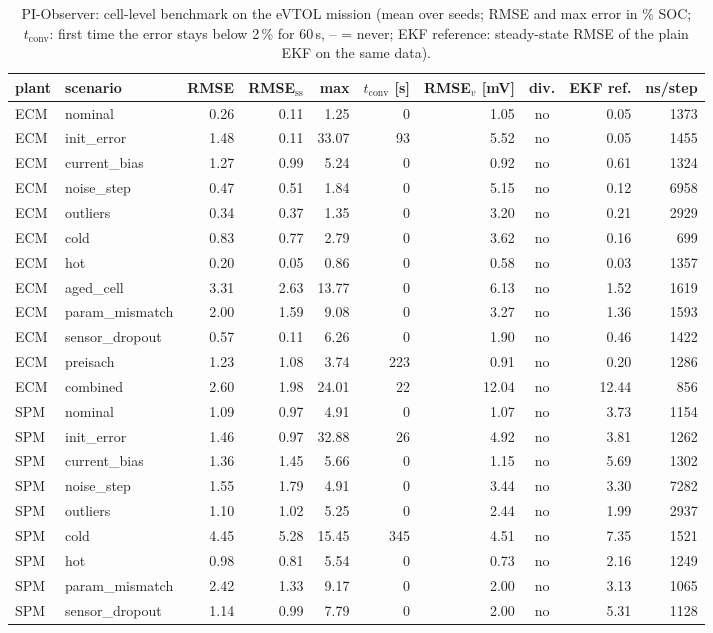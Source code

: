 \begin{table}[H]\centering\footnotesize\setlength{\tabcolsep}{4pt}
\caption{PI-Observer: cell-level benchmark on the eVTOL mission (mean over seeds; RMSE and max error in \% SOC; $t_\mathrm{conv}$: first time the error stays below 2\,\% for 60\,s, -- = never; EKF reference: steady-state RMSE of the plain EKF on the same data).}\label{tab:cell_PIObserver}
\begin{tabular}{llrrrrrcrr}\toprule
plant & scenario & RMSE & RMSE$_\mathrm{ss}$ & max & $t_\mathrm{conv}$ [s] & RMSE$_v$ [mV] & div. & EKF ref. & ns/step \\ \midrule
ECM & nominal & 0.26 & 0.11 & 1.25 & 0 & 1.05 & no & 0.05 & 1373 \\
ECM & init\_error & 1.48 & 0.11 & 33.07 & 93 & 5.52 & no & 0.05 & 1455 \\
ECM & current\_bias & 1.27 & 0.99 & 5.24 & 0 & 0.92 & no & 0.61 & 1324 \\
ECM & noise\_step & 0.47 & 0.51 & 1.84 & 0 & 5.15 & no & 0.12 & 6958 \\
ECM & outliers & 0.34 & 0.37 & 1.35 & 0 & 3.20 & no & 0.21 & 2929 \\
ECM & cold & 0.83 & 0.77 & 2.79 & 0 & 3.62 & no & 0.16 & 699 \\
ECM & hot & 0.20 & 0.05 & 0.86 & 0 & 0.58 & no & 0.03 & 1357 \\
ECM & aged\_cell & 3.31 & 2.63 & 13.77 & 0 & 6.13 & no & 1.52 & 1619 \\
ECM & param\_mismatch & 2.00 & 1.59 & 9.08 & 0 & 3.27 & no & 1.36 & 1593 \\
ECM & sensor\_dropout & 0.57 & 0.11 & 6.26 & 0 & 1.90 & no & 0.46 & 1422 \\
ECM & preisach & 1.23 & 1.08 & 3.74 & 223 & 0.91 & no & 0.20 & 1286 \\
ECM & combined & 2.60 & 1.98 & 24.01 & 22 & 12.04 & no & 12.44 & 856 \\
\midrule
SPM & nominal & 1.09 & 0.97 & 4.91 & 0 & 1.07 & no & 3.73 & 1154 \\
SPM & init\_error & 1.46 & 0.97 & 32.88 & 26 & 4.92 & no & 3.81 & 1262 \\
SPM & current\_bias & 1.36 & 1.45 & 5.66 & 0 & 1.15 & no & 5.69 & 1302 \\
SPM & noise\_step & 1.55 & 1.79 & 4.91 & 0 & 3.44 & no & 3.30 & 7282 \\
SPM & outliers & 1.10 & 1.02 & 5.25 & 0 & 2.44 & no & 1.99 & 2937 \\
SPM & cold & 4.45 & 5.28 & 15.45 & 345 & 4.51 & no & 7.35 & 1521 \\
SPM & hot & 0.98 & 0.81 & 5.54 & 0 & 0.73 & no & 2.16 & 1249 \\
SPM & param\_mismatch & 2.42 & 1.33 & 9.17 & 0 & 2.00 & no & 3.13 & 1065 \\
SPM & sensor\_dropout & 1.14 & 0.99 & 7.79 & 0 & 2.00 & no & 5.31 & 1128 \\
\bottomrule\end{tabular}\end{table}
